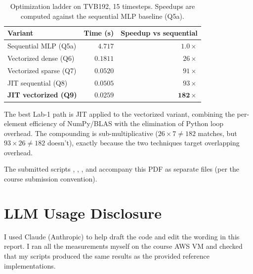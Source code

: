 \documentclass[11pt, a4paper]{article}
\begin{document}
\begin{table}[H]
    \centering
    \caption{Optimization ladder on TVB192, 15 timesteps. Speedups are computed against the sequential MLP baseline (Q5a).}
    \label{tab:q9-ladder}
    \begin{tabular}{lrr}
        \toprule
        Variant & Time (s) & Speedup vs sequential \\
        \midrule
        Sequential MLP (Q5a)              & $4.717$  & $1.0\times$ \\
        Vectorized dense (Q6)             & $0.1811$ & $26\times$ \\
        Vectorized sparse (Q7)            & $0.0520$ & $91\times$ \\
        JIT sequential (Q8)               & $0.0505$ & $93\times$ \\
        \textbf{JIT vectorized (Q9)}      & $\mathbf{0.0259}$ & $\mathbf{182\times}$ \\
        \bottomrule
    \end{tabular}
\end{table}

The best Lab-1 path is JIT applied to the vectorized variant, combining
the per-element efficiency of NumPy/BLAS with the elimination of Python
loop overhead. The compounding is sub-multiplicative ($26 \times 7 \neq 182$
matches, but $93 \times 26 \neq 182$ doesn't), exactly because the two
techniques target overlapping overhead.

The submitted scripts , ,
, and  accompany this PDF as separate
files (per the course submission convention).

\section{LLM Usage Disclosure}

\noindent
I used Claude (Anthropic) to help draft the code and edit the wording
in this report. I ran all the measurements myself on the course AWS VM
and checked that my scripts produced the same results as the provided
reference implementations.
\end{document}
